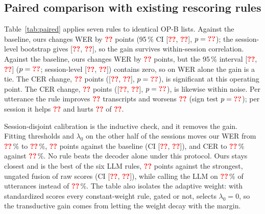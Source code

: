 \documentclass[conference,a4paper,10pt]{IEEEtran}
\newcommand{\pct}{\,\%}
\newcommand{\RvPend}{\textcolor{red}{\textbf{??}}}
\newcommand{\RvBaseCERcv}{\RvPend}
\newcommand{\RvUngRawCalls}{\RvPend}
\newcommand{\RvOursWER}{\RvPend}
\newcommand{\RvOursWERcv}{\RvPend}
\newcommand{\RvOursCERcv}{\RvPend}
\newcommand{\RvOursCalls}{\RvPend}
\newcommand{\RvDWER}{\RvPend}
\newcommand{\RvCIlo}{\RvPend}
\newcommand{\RvCIhi}{\RvPend}
\newcommand{\RvPw}{\RvPend}
\newcommand{\RvSessCIlo}{\RvPend}
\newcommand{\RvSessCIhi}{\RvPend}
\newcommand{\RvDCER}{\RvPend}
\newcommand{\RvCERCIlo}{\RvPend}
\newcommand{\RvCERCIhi}{\RvPend}
\newcommand{\RvPc}{\RvPend}
\newcommand{\RvUttBetter}{\RvPend}
\newcommand{\RvUttWorse}{\RvPend}
\newcommand{\RvPsign}{\RvPend}
\newcommand{\RvSessBetter}{\RvPend}
\newcommand{\RvSessWorse}{\RvPend}
\newcommand{\RvNsess}{\RvPend}
\newcommand{\RvDWERcv}{\RvPend}
\newcommand{\RvCIloCV}{\RvPend}
\newcommand{\RvCIhiCV}{\RvPend}
\newcommand{\RvDWERbest}{\RvPend}
\newcommand{\RvCIloBest}{\RvPend}
\newcommand{\RvCIhiBest}{\RvPend}
\begin{document}
\subsection{Paired comparison with existing rescoring rules}\label{subsec:paired}
Table~\ref{tab:paired} applies seven rules to identical OP-B lists. \ifRvSig
Against the baseline, ours changes WER by \RvDWER{} points (95\pct{} CI
[\RvCIlo, \RvCIhi], $p=\RvPw$); the session-level bootstrap gives
[\RvSessCIlo, \RvSessCIhi], so the gain survives within-session correlation.
\else Against the baseline, ours changes WER by \RvDWER{} points, but the
95\pct{} interval [\RvCIlo, \RvCIhi] ($p=\RvPw$; session-level
[\RvSessCIlo, \RvSessCIhi]) contains zero, so on WER alone the gain is a tie.
\fi{} \ifRvCERSig The CER change, \RvDCER{} points
([\RvCERCIlo, \RvCERCIhi], $p=\RvPc$), is significant at this operating
point. \else The CER change,
\RvDCER{} points ([\RvCERCIlo, \RvCERCIhi], $p=\RvPc$), is likewise within
noise. \fi{} Per utterance the rule improves \RvUttBetter{} transcripts and
worsens \RvUttWorse{} (sign test $p=\RvPsign$); per session it helps
\RvSessBetter{} and hurts \RvSessWorse{} of \RvNsess.

Session-disjoint calibration is the inductive check, and it removes the gain.
Fitting thresholds and $\lambda_0$ on the other half of the sessions moves our
WER from \RvOursWER\pct{} to \RvOursWERcv\pct{}, \RvDWERcv{} points against
the baseline (CI [\RvCIloCV, \RvCIhiCV]), and CER to \RvOursCERcv\pct{}
against \RvBaseCERcv\pct{}. No rule beats the decoder alone under
this protocol. Ours stays closest and is the best of the six LLM rules,
\RvDWERbest{} points against the strongest, ungated fusion of raw scores (CI
[\RvCIloBest, \RvCIhiBest]), while calling the LLM on \RvOursCalls\pct{} of
utterances instead of \RvUngRawCalls\pct{}. The table also isolates the
adaptive weight: with standardized scores every constant-weight rule, gated or
not, selects $\lambda_0=0$, so the transductive gain comes from letting the
weight decay with the margin.
\end{document}
